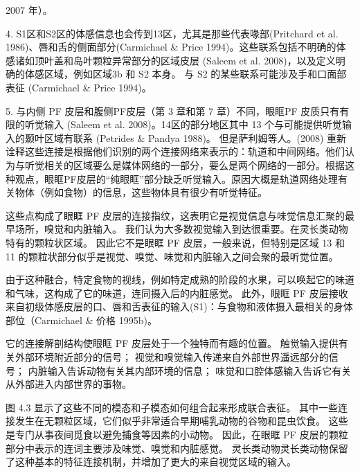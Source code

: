 2007 年）。\par
4. S1区和S2区的体感信息也会传到13区，尤其是那些代表喙部(Pritchard et al. 1986)、唇和舌的侧面部分(Carmichael \& Price 1994)。这些联系包括不明确的体感诸如顶叶盖和岛叶颗粒异常部分的区域皮层 (Saleem et al. 2008)，以及定义明确的体感区域，例如区域3b 和 S2 本身。 与 S2 的某些联系可能涉及手和口面部表征 (Carmichael \& Price 1994)。\par
5. 与内侧 PF 皮层和腹侧PF皮层（第 3 章和第 7 章）不同，眼眶PF 皮质只有有限的听觉输入 (Saleem et al. 2008)。14区的部分地区其中 13 个与可能提供听觉输入的颞叶区域有联系 (Petrides \& Pandya 1988)。 但是萨利姆等人。(2008) 重新诠释这些连接是根据他们识别的两个连接网络来表示的：轨道和中间网络。他们认为与听觉相关的区域要么是媒体网络的一部分，要么是两个网络的一部分。根据这种观点，眼眶PF皮层的“纯眼眶”部分缺乏听觉输入。原因大概是轨道网络处理有关物体（例如食物）的信息，这些物体具有很少有听觉特征。\par
这些点构成了眼眶 PF 皮层的连接指纹，这表明它是视觉信息与味觉信息汇聚的最早场所，嗅觉和内脏输入。 我们认为大多数视觉输入到达很重要。在灵长类动物特有的颗粒状区域。 因此它不是眼眶 PF 皮层，一般来说，但特别是区域 13 和 11 的颗粒状部分似乎是视觉、嗅觉、味觉和内脏输入之间会聚的最听觉位置。\par
由于这种融合，特定食物的视线，例如特定成熟的阶段的水果，可以唤起它的味道和气味，这构成了它的味道，连同摄入后的内脏感觉。 此外，眼眶 PF 皮层接收来自初级体感皮层的口、唇和舌表征的输入(S1)：与食物和液体摄入最相关的身体部位（Carmichael
\& 价格 1995b)。\par
它的连接解剖结构使眼眶 PF 皮层处于一个独特而有趣的位置。 触觉输入提供有关外部环境附近部分的信号； 视觉和嗅觉输入传递来自外部世界遥远部分的信号； 内脏输入告诉动物有关其内部环境的信息； 味觉和口腔体感输入告诉它有关从外部进入内部世界的事物。\par
图 4.3 显示了这些不同的模态和子模态如何组合起来形成联合表征。 其中一些连接发生在无颗粒区域，它们似乎非常适合早期哺乳动物的谷物和昆虫饮食。 这些是专门从事夜间觅食以避免捕食等因素的小动物。 因此，在眼眶 PF 皮层的颗粒部分中表示的连词主要涉及味觉、嗅觉和内脏感觉。 灵长类动物灵长类动物保留了这种基本的特征连接机制，并增加了更大的来自视觉区域的输入。\par
